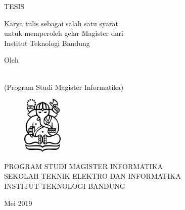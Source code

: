 \clearpage
\pagestyle{empty}

\begin{center}
\smallskip
	
	\bfseries \begin{spacing}{1}
    \Large \MakeUppercase{\thetitle}
    \end{spacing}
    \vfill

    \Large \MakeUppercase{Tesis}
	
	\begin{spacing}{1}
    \large
    	Karya tulis sebagai salah satu syarat \\
    	untuk memperoleh gelar Magister dari \\
    	Institut Teknologi Bandung
    \vfill
    \end{spacing}

    \large Oleh
    
    \begin{spacing}{1}
		\Large \MakeUppercase \theauthor \\
		(Program Studi Magister Informatika)  
    \end{spacing}

    \vfill
    \begin{figure}[h]
        \centering
      	\includegraphics[width=0.17\textwidth]{resources/cover-ganesha.jpg}
    \end{figure}
    \vfill

    \large
    \uppercase{
        Program Studi Magister Informatika \\
        Sekolah Teknik Elektro dan Informatika \\
        Institut Teknologi Bandung
    }

    Mei 2019

\end{center}

\clearpage
